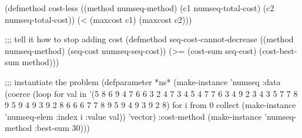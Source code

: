 (defmethod cost-less ((method numseq-method)
		      (c1 numseq-total-cost)
		      (c2 numseq-total-cost))
  (< (maxcost c1) (maxcost c2)))


;;; tell it how to stop adding cost
(defmethod seq-cost-cannot-decrease ((method numseq-method)
				     (seq-cost numseq-seq-cost))
  (>= (cost-sum seq-cost)
      (cost-best-sum method)))

;;; instantiate the problem
(defparameter *ns*
  (make-instance 'numseq
    :data (coerce (loop for val in '(5 8 6 9 4 7 6 6 3 2 4 7 3 4
				     5 4 7 7 6 3 4 9 2 3 4 3 5
				     7 7 8 9 5 9 4 9 3 9 2 8 6 6
				     6 7 7 8 9 5 9 4 9 3 9 2 8)
			for i from 0
			collect (make-instance 'numseq-elem :index i :value val))
		  'vector)
    :cost-method (make-instance 'numseq-method :best-sum 30)))

